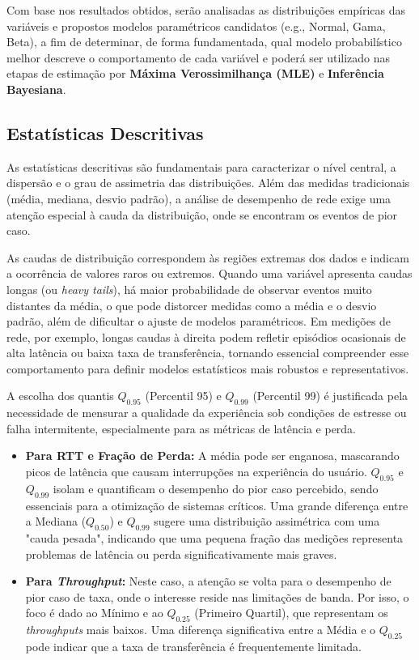 \documentclass{article}
\begin{document}
Com base nos resultados obtidos, serão analisadas as distribuições empíricas das variáveis
e propostos modelos paramétricos candidatos (e.g., Normal, Gama, Beta),
a fim de determinar, de forma fundamentada, qual modelo probabilístico melhor descreve
o comportamento de cada variável e poderá ser utilizado nas etapas de estimação por
\textbf{Máxima Verossimilhança (MLE)} e \textbf{Inferência Bayesiana}.

\subsection{Estatísticas Descritivas}

As estatísticas descritivas são fundamentais para caracterizar o nível central, a dispersão e o grau de assimetria das distribuições. Além das medidas tradicionais (média, mediana, desvio padrão), a análise de desempenho de rede exige uma atenção especial à cauda da distribuição, onde se encontram os eventos de pior caso.

As caudas de distribuição correspondem às regiões extremas dos dados e indicam a ocorrência de valores raros ou extremos. Quando uma variável apresenta caudas longas (ou \textit{heavy tails}), há maior probabilidade de observar eventos muito distantes da média, o que pode distorcer medidas como a média e o desvio padrão, além de dificultar o ajuste de modelos paramétricos. Em medições de rede, por exemplo, longas caudas à direita podem refletir episódios ocasionais de alta latência ou baixa taxa de transferência, tornando essencial compreender esse comportamento para definir modelos estatísticos mais robustos e representativos.

A escolha dos quantis $Q_{0.95}$ (Percentil 95) e $Q_{0.99}$ (Percentil 99) é justificada pela necessidade de mensurar a qualidade da experiência sob condições de estresse ou falha intermitente, especialmente para as métricas de latência e perda.

\begin{itemize}
	\item \textbf{Para RTT e Fração de Perda:} A média pode ser enganosa, mascarando picos de latência que causam interrupções na experiência do usuário. $Q_{0.95}$ e $Q_{0.99}$ isolam e quantificam o desempenho do pior caso percebido, sendo essenciais para a otimização de sistemas críticos. Uma grande diferença entre a Mediana ($Q_{0.50}$) e $Q_{0.99}$ sugere uma distribuição assimétrica com uma "cauda pesada", indicando que uma pequena fração das medições representa problemas de latência ou perda significativamente mais graves.
	
	\item \textbf{Para \textit{Throughput}:} Neste caso, a atenção se volta para o desempenho de pior caso de taxa, onde o interesse reside nas limitações de banda. Por isso, o foco é dado ao Mínimo e ao $Q_{0.25}$ (Primeiro Quartil), que representam os \textit{throughputs} mais baixos. Uma diferença significativa entre a Média e o $Q_{0.25}$ pode indicar que a taxa de transferência é frequentemente limitada.
\end{itemize}
\end{document}
